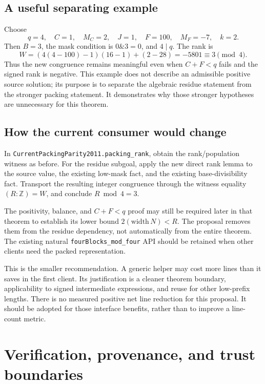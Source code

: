 \documentclass[11pt,a4paper]{article}
\newcommand{\code}[1]{\texttt{#1}}
\begin{document}
\subsection{A useful separating example}

Choose
\[
 q=4,\quad C=1,\quad M_C=2,\quad J=1,
 \quad F=100,\quad M_F=-7,\quad k=2.
\]
Then \(B=3\), the mask condition is \(0\mathbin{\&}3=0\), and \(4\mid q\). The rank is
\[
 W=(4(4-100)-1)(16-1)+(2-28)=-5801\equiv3\pmod4.
\]
Thus the new congruence remains meaningful even when \(C+F<q\) fails and the signed rank is negative. This example does not describe an admissible positive source solution; its purpose is to separate the algebraic residue statement from the stronger packing statement. It demonstrates why those stronger hypotheses are unnecessary for this theorem.

\subsection{How the current consumer would change}

In \code{CurrentPackingParity2011.packing\_rank}, obtain the rank/population witness as before. For the residue subgoal, apply the new direct rank lemma to the source value, the existing low-mask fact, and the existing base-divisibility fact. Transport the resulting integer congruence through the witness equality \((R:\mathbb Z)=W\), and conclude \(R\bmod4=3\).

The positivity, balance, and \(C+F<q\) proof may still be required later in that theorem to establish its lower bound \(2(\mathrm{width}\,N)<R\). The proposal removes them from the residue dependency, not automatically from the entire theorem. The existing natural \code{fourBlocks\_mod\_four} API should be retained when other clients need the packed representation.

This is the smaller recommendation. A generic helper may cost more lines than it saves in the first client. Its justification is a cleaner theorem boundary, applicability to signed intermediate expressions, and reuse for other low-prefix lengths. There is no measured positive net line reduction for this proposal. It should be adopted for those interface benefits, rather than to improve a line-count metric.

\section{Verification, provenance, and trust boundaries}
\end{document}
